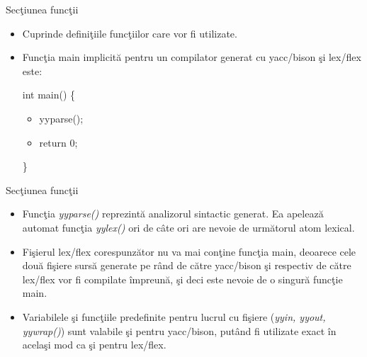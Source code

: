 \documentclass[pdf]{beamer}
\begin{document}
\begin{frame}{Secţiunea funcţii}
\begin{itemize}
	\item
	Cuprinde definiţiile funcţiilor care vor fi utilizate.

	\item
	Funcţia main implicită pentru un compilator generat cu yacc/bison şi lex/flex este:
	\newline

	int main()
		\linebreak
		\{

		\begin{itemize}
			\item[]
			 yyparse();

			\item[]
			return 0;
		\end{itemize}

		\}
\end{itemize}
\end{frame}



\begin{frame}{Secţiunea funcţii}
\begin{itemize}
	\item
	Funcţia \textit{yyparse()} reprezintă analizorul sintactic generat. Ea apelează automat funcţia \textit{yylex()} ori de câte ori are nevoie de următorul atom lexical. 
\newline

	\item
	Fişierul lex/flex corespunzător nu va mai conţine funcţia main, deoarece cele două fişiere sursă generate pe rând de către yacc/bison şi respectiv de către lex/flex vor fi compilate împreună, şi deci este nevoie de o singură funcţie main.
\newline

	\item
	Variabilele şi funcţiile predefinite pentru lucrul cu fişiere (\textit{yyin, yyout, yywrap()}) sunt valabile şi pentru yacc/bison, putând fi utilizate exact în acelaşi mod ca şi pentru lex/flex.
\newline
\end{itemize}
\end{frame}
\end{document}
